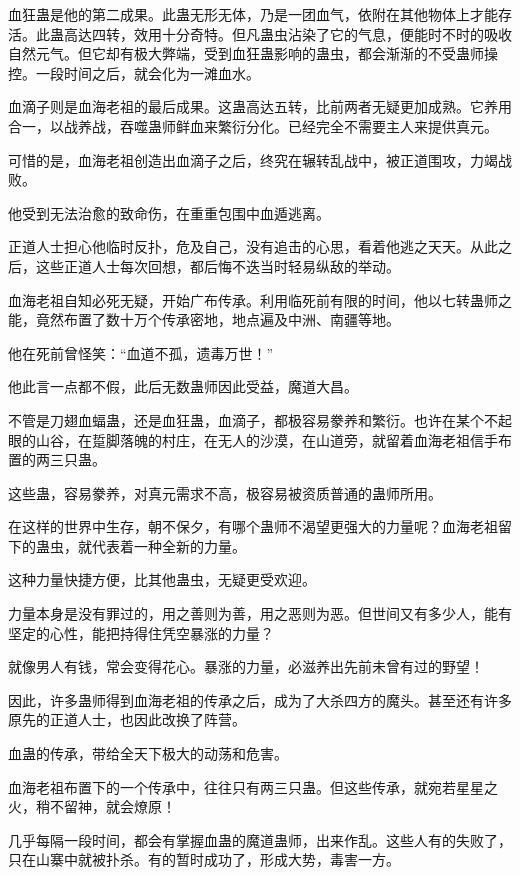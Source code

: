 \begin{this_body}
血狂蛊是他的第二成果。此蛊无形无体，乃是一团血气，依附在其他物体上才能存活。此蛊高达四转，效用十分奇特。但凡蛊虫沾染了它的气息，便能时不时的吸收自然元气。但它却有极大弊端，受到血狂蛊影响的蛊虫，都会渐渐的不受蛊师操控。一段时间之后，就会化为一滩血水。

血滴子则是血海老祖的最后成果。这蛊高达五转，比前两者无疑更加成熟。它养用合一，以战养战，吞噬蛊师鲜血来繁衍分化。已经完全不需要主人来提供真元。

可惜的是，血海老祖创造出血滴子之后，终究在辗转乱战中，被正道围攻，力竭战败。

他受到无法治愈的致命伤，在重重包围中血遁逃离。

正道人士担心他临时反扑，危及自己，没有追击的心思，看着他逃之天天。从此之后，这些正道人士每次回想，都后悔不迭当时轻易纵敌的举动。

血海老祖自知必死无疑，开始广布传承。利用临死前有限的时间，他以七转蛊师之能，竟然布置了数十万个传承密地，地点遍及中洲、南疆等地。

他在死前曾怪笑：“血道不孤，遗毒万世！”

他此言一点都不假，此后无数蛊师因此受益，魔道大昌。

不管是刀翅血蝠蛊，还是血狂蛊，血滴子，都极容易豢养和繁衍。也许在某个不起眼的山谷，在踅脚落魄的村庄，在无人的沙漠，在山道旁，就留着血海老祖信手布置的两三只蛊。

这些蛊，容易豢养，对真元需求不高，极容易被资质普通的蛊师所用。

在这样的世界中生存，朝不保夕，有哪个蛊师不渴望更强大的力量呢？血海老祖留下的蛊虫，就代表着一种全新的力量。

这种力量快捷方便，比其他蛊虫，无疑更受欢迎。

力量本身是没有罪过的，用之善则为善，用之恶则为恶。但世间又有多少人，能有坚定的心性，能把持得住凭空暴涨的力量？

就像男人有钱，常会变得花心。暴涨的力量，必滋养出先前未曾有过的野望！

因此，许多蛊师得到血海老祖的传承之后，成为了大杀四方的魔头。甚至还有许多原先的正道人士，也因此改换了阵营。

血蛊的传承，带给全天下极大的动荡和危害。

血海老祖布置下的一个传承中，往往只有两三只蛊。但这些传承，就宛若星星之火，稍不留神，就会燎原！

几乎每隔一段时间，都会有掌握血蛊的魔道蛊师，出来作乱。这些人有的失败了，只在山寨中就被扑杀。有的暂时成功了，形成大势，毒害一方。


\end{this_body}
